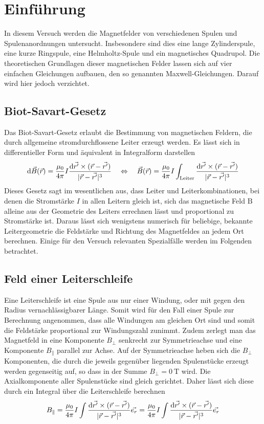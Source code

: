 \section{Einführung}
In diesem Versuch werden die Magnetfelder von verschiedenen Spulen und Spulenanordnungen untersucht. Insbesondere sind dies eine lange Zylinderspule, eine kurze Ringspule, eine Helmholtz-Spule und ein magnetisches Quadrupol. Die theoretischen Grundlagen dieser magnetischen Felder lassen sich auf vier einfachen Gleichungen aufbauen, den so genannten Maxwell-Gleichungen. Darauf wird hier jedoch verzichtet.
\subsection{Biot-Savart-Gesetz}
Das Biot-Savart-Gesetz erlaubt die Bestimmung von magnetischen Feldern, die durch allgemeine stromdurchflossene Leiter erzeugt werden. Es lässt sich in differentieller Form und äquivalent in Integralform darstellen
\begin{equation}
	\mathrm{d} \vec{B}(\vec{r}) = \frac{\mu_0}{4\pi} I \frac{\mathrm{d}\vec{r'}\times (\vec{r} - \vec{r'})}{|\vec{r} - \vec{r'}|^3} \quad \Leftrightarrow \quad 
	\vec{B}(\vec{r}) = \frac{\mu_0}{4\pi} I \int\nolimits_{\text{Leiter}} \frac{\mathrm{d}\vec{r'}\times (\vec{r} - \vec{r'})}{|\vec{r} - \vec{r'}|^3}
\end{equation}
Dieses Gesetz sagt im wesentlichen aus, dass Leiter und Leiterkombinationen, bei denen die Stromstärke $ I $ in allen Leitern gleich ist, sich das magnetische Feld $ \mathrm{B} $ alleine aus der Geometrie des Leiters errechnen lässt und proportional zu Stromstärke ist.
Daraus lässt sich wenigstens numerisch für beliebige, bekannte Leitergeometrie die Feldstärke und Richtung des Magnetfeldes an jedem Ort berechnen. Einige für den Versuch relevanten Spezialfälle werden im Folgenden betrachtet.

\subsection{Feld einer Leiterschleife}
Eine Leiterschleife ist eine Spule aus nur einer Windung, oder mit gegen den Radius vernachlässigbarer Länge. Somit wird für den Fall einer Spule zur Berechnung angenommen, dass alle Windungen am gleichen Ort sind und somit die Feldstärke proportional zur Windungszahl zunimmt. Zudem zerlegt man das Magnetfeld in eine Komponente $ B_\perp $ senkrecht zur Symmetrieachse und eine Komponente $ B_\parallel $ parallel zur Achse. Auf der Symmetrieachse heben sich die $ B_\perp $ Komponenten, die durch die jeweils gegenüber liegenden Spulenstücke erzeugt werden gegenseitig auf, so dass in der Summe $ B_\perp = \SI{0}{\tesla} $ wird. Die Axialkomponente aller Spulenstücke sind gleich gerichtet. Daher lässt sich diese durch ein Integral über die Leiterschleife berechnen
\begin{equation}
 	B_\parallel = \frac{\mu_0}{4\pi} I \int \frac{\mathrm{d}\vec{r'}\times (\vec{r} - \vec{r'})}{|\vec{r} - \vec{r'}|^3} \vec{e_r} = \frac{\mu_0}{4\pi} I \int \frac{\mathrm{d}\vec{r'}\times (\vec{r} - \vec{r'})}{|\vec{r} - \vec{r'}|^3} \vec{e_r}
\end{equation}
